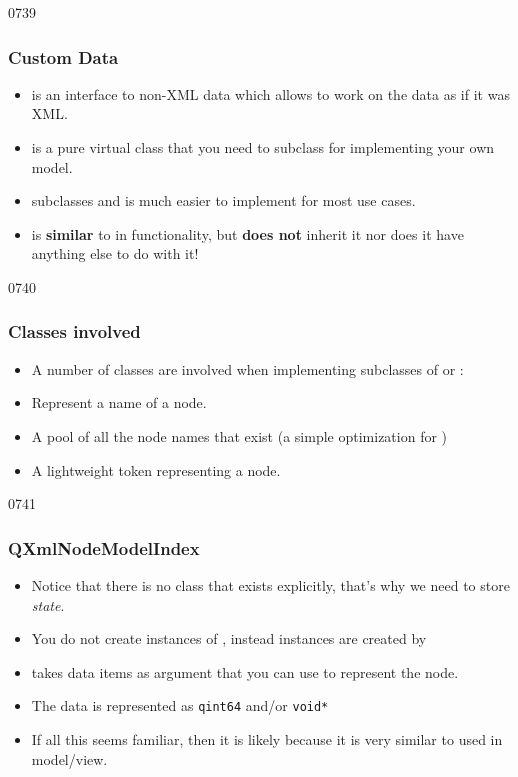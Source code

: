 \begin{slide}{0739}
\frametitle{Custom Data}\label{custom-data}
\begin{itemize}
\item {} is an interface to non-XML data which
  allows  to work on the data as if it was XML.
\item {} is a pure virtual class that you need to
  subclass for implementing your own model.
\item {} subclasses 
  and is much easier to implement for most use cases.
\item \pleaseNote {} is \textbf{similar} to
   in functionality, but \textbf{does not} inherit
  it nor does it have anything else to do with it!
\end{itemize}
\vspace{-3mm}
\end{slide}

\begin{slide}{0740}\frametitle{Classes involved}
\begin{itemize}
\item A number of classes are involved when implementing subclasses of
   or :

  \item {} Represent a name of a node.
  \item {} A pool of all the node names that exist (a simple optimization for )
  \item {} A lightweight token representing
    a node.
\end{itemize}
\end{slide}

\begin{slide}{0741}\frametitle{QXmlNodeModelIndex}
\begin{itemize}
  \item  Notice that there is no  class that exists
    explicitly, that's why we need  to store \emph{state}.
  \item You do not create instances of
    , instead instances are created by 
\item {} takes data items as argument
  that you can use to represent the node.
\item The data is represented as \texttt{qint64} and/or \texttt{void*}
\item If all this seems familiar, then it is likely because it is very
  similar to  used in model/view.
\end{itemize}
\end{slide}

